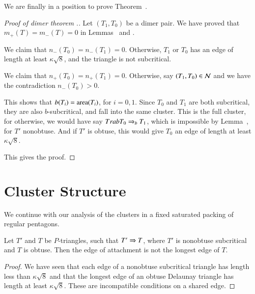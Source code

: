 We are finally in a position to prove Theorem~.

\begin{proof}[Proof of dimer theorem .]
  Let $(T_1,T_0)$ be a dimer pair.  We have proved that
  $m_+(T)=m_-(T)=0$ in Lemmas~ and
  .

  We claim that $n_-(T_0)=n_-(T_1)=0$.  Otherwise, $T_1$ or $T_0$ has
  an edge of length at least $\kappa\sqrt8$, and the triangle is not
  subcritical.

  We claim that $n_+(T_0)=n_+(T_1)=0$.  Otherwise, say
  $(T_1,T_0)\in\mathcal N$ and we have the contradiction $n_-(T_0)>0$.

  This shows that $b(T_i)={\operatorname{area}}(T_i)$, for $i=0,1$.  Since $T_0$ and
  $T_1$ are both subcritical, they are also $b$-subcritical, and fall
  into the same cluster.  This is the full cluster, for otherwise, we
  would have say $T\\rab T_0\Rightarrow_{b} T_1$, which is impossible by
  Lemma~, for $T'$ nonobtuse.  And if $T'$ is
  obtuse, this would give $T_0$ an edge of length at least
  $\kappa\sqrt8$.

  This gives the proof.
\end{proof}


\section{Cluster Structure}




We continue with our analysis of the clusters in a fixed saturated
packing of regular pentagons.  

\begin{lemma}  
  Let $T'$ and $T$ be $P$-triangles, such that $T'\Rightarrow T$, where
  $T'$ is nonobtuse subcritical and $T$ is obtuse.  Then the edge
  of attachment is not the longest edge of $T$.
\end{lemma}

\begin{proof} We have seen that each edge of a nonobtuse subcritical
  triangle has length less than $\kappa\sqrt8$ and that the longest
  edge of an obtuse Delaunay triangle has length at least
  $\kappa\sqrt{8}$.  These are incompatible conditions on a shared
  edge.
\end{proof}

